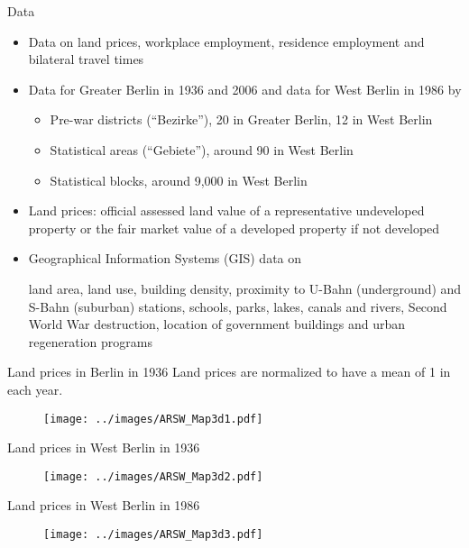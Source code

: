 \documentclass[11pt,notes=hide,aspectratio=169]{beamer}
\begin{document}
\begin{frame}{Data}
\begin{itemize}
\item Data on land prices, workplace employment, residence employment and bilateral travel times
\item Data for Greater Berlin in 1936 and 2006 and data for West Berlin in 1986 by
	\begin{itemize}
	\item Pre-war districts (``Bezirke''), 20 in Greater Berlin, 12 in West Berlin
	\item Statistical areas (``Gebiete''), around 90 in West Berlin
	\item Statistical blocks, around 9,000 in West Berlin
	\end{itemize}
\item Land prices: official assessed land value of a representative undeveloped property or the fair market value of a developed property if not developed
\item Geographical Information Systems (GIS) data on\\
{\small land area, land use, building density, proximity to U-Bahn (underground) and S-Bahn (suburban) stations, schools, parks, lakes, canals and rivers, Second World War destruction, location of government buildings and urban regeneration programs\par}
\end{itemize}
\end{frame}
\begin{frame}{Land prices in Berlin in 1936}
Land prices are normalized to have a mean of 1 in each year.
\begin{figure}
\centering
\texttt{[image: ../images/ARSW\_Map3d1.pdf]}
\end{figure}
\end{frame}
\begin{frame}{Land prices in West Berlin in 1936}
\begin{figure}
\centering
\texttt{[image: ../images/ARSW\_Map3d2.pdf]}
\end{figure}
\end{frame}
\begin{frame}{Land prices in West Berlin in 1986}
\begin{figure}
\centering
\texttt{[image: ../images/ARSW\_Map3d3.pdf]}
\end{figure}
\end{frame}
\end{document}
